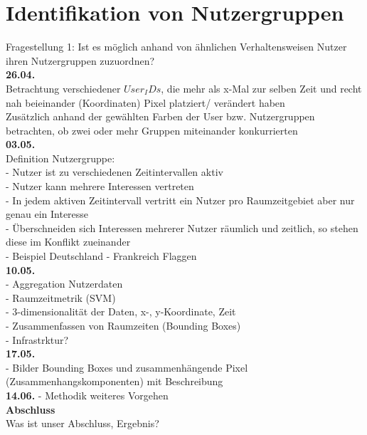 \section{Identifikation von Nutzergruppen} \label{question1}  %

Fragestellung 1: Ist es möglich anhand von {\"a}hnlichen Verhaltensweisen Nutzer ihren Nutzergruppen zuzuordnen?\\

\textbf{26.04.}\\
Betrachtung verschiedener $User_IDs$, die mehr als x-Mal zur selben Zeit und recht nah beieinander (Koordinaten) Pixel platziert/ ver{\"a}ndert haben\\
Zusätzlich anhand der gew{\"a}hlten Farben der User bzw. Nutzergruppen betrachten, ob zwei oder mehr Gruppen miteinander konkurrierten\\
\textbf{03.05.}\\
Definition Nutzergruppe:\\
- Nutzer ist zu verschiedenen Zeitintervallen aktiv\\
- Nutzer kann mehrere Interessen vertreten\\
- In jedem aktiven Zeitintervall vertritt ein Nutzer pro Raumzeitgebiet aber nur genau ein Interesse\\
- {\"U}berschneiden sich Interessen mehrerer Nutzer r{\"a}umlich und zeitlich, so stehen diese im Konflikt zueinander\\
- Beispiel Deutschland - Frankreich Flaggen\\
\textbf{10.05.}\\
- Aggregation Nutzerdaten\\
- Raumzeitmetrik (SVM)\\
- 3-dimensionalit{\"a}t der Daten, x-, y-Koordinate, Zeit\\
- Zusammenfassen von Raumzeiten (Bounding Boxes)\\
- Infrastrktur?\\
\textbf{17.05.}\\
- Bilder Bounding Boxes und zusammenh{\"a}ngende Pixel (Zusammenhangskomponenten) mit Beschreibung\\

\textbf{14.06.}
- Methodik weiteres Vorgehen\\

\textbf{Abschluss}\\
Was ist unser Abschluss, Ergebnis?


